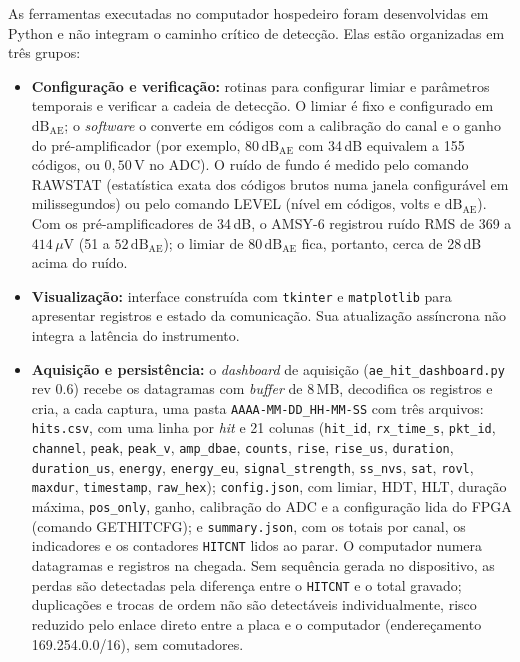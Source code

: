 As ferramentas executadas no computador hospedeiro foram desenvolvidas em Python e não integram o caminho crítico de detecção. Elas estão organizadas em três grupos:
\begin{itemize}
	\item \textbf{Configuração e verificação:} rotinas para configurar limiar e parâmetros temporais e verificar a cadeia de detecção. O limiar é fixo e configurado em \(\mathrm{dB}_{\mathrm{AE}}\); o \textit{software} o converte em códigos com a calibração do canal e o ganho do pré-amplificador (por exemplo, \(80\,\mathrm{dB}_{\mathrm{AE}}\) com 34\,dB equivalem a 155 códigos, ou \(0{,}50\,\mathrm{V}\) no ADC). O ruído de fundo é medido pelo comando RAWSTAT (estatística exata dos códigos brutos numa janela configurável em milissegundos) ou pelo comando LEVEL (nível em códigos, volts e \(\mathrm{dB}_{\mathrm{AE}}\)). Com os pré-amplificadores de 34\,dB, o AMSY-6 registrou ruído RMS de 369 a \(414\,\mu\mathrm{V}\) (51 a \(52\,\mathrm{dB}_{\mathrm{AE}}\)); o limiar de \(80\,\mathrm{dB}_{\mathrm{AE}}\) fica, portanto, cerca de 28\,dB acima do ruído.

	\item \textbf{Visualização:} interface construída com \texttt{tkinter} e \texttt{matplotlib} para apresentar registros e estado da comunicação. Sua atualização assíncrona não integra a latência do instrumento.

	\item \textbf{Aquisição e persistência:} o \textit{dashboard} de aquisição (\texttt{ae\_hit\_dashboard.py} rev 0.6) recebe os datagramas com \textit{buffer} de 8\,MB, decodifica os registros e cria, a cada captura, uma pasta \texttt{AAAA-MM-DD\_HH-MM-SS} com três arquivos: \texttt{hits.csv}, com uma linha por \textit{hit} e 21 colunas (\texttt{hit\_id}, \texttt{rx\_time\_s}, \texttt{pkt\_id}, \texttt{channel}, \texttt{peak}, \texttt{peak\_v}, \texttt{amp\_dbae}, \texttt{counts}, \texttt{rise}, \texttt{rise\_us}, \texttt{duration}, \texttt{duration\_us}, \texttt{energy}, \texttt{energy\_eu}, \texttt{signal\_strength}, \texttt{ss\_nvs}, \texttt{sat}, \texttt{rovl}, \texttt{maxdur}, \texttt{timestamp}, \texttt{raw\_hex}); \texttt{config.json}, com limiar, HDT, HLT, duração máxima, \texttt{pos\_only}, ganho, calibração do ADC e a configuração lida do FPGA (comando GETHITCFG); e \texttt{summary.json}, com os totais por canal, os indicadores e os contadores \texttt{HITCNT} lidos ao parar. O computador numera datagramas e registros na chegada. Sem sequência gerada no dispositivo, as perdas são detectadas pela diferença entre o \texttt{HITCNT} e o total gravado; duplicações e trocas de ordem não são detectáveis individualmente, risco reduzido pelo enlace direto entre a placa e o computador (endereçamento 169.254.0.0/16), sem comutadores.
\end{itemize}


